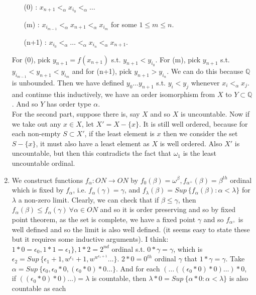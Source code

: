 \begin{enumerate}
    \begin{enumerate}
    \item[(0)]: $x_{n+1}<_\alpha x_{i_0} <_\alpha \ldots$\\
    \item[(m)]: $x_{i_{m-1}} <_\alpha x_{n+1} <_\alpha x_{i_m}$ for some $1 \le m \le n$.\\
    \item[(n+1)]: $x_{i_0} <_\alpha \ldots <_\alpha x_{i_n} <_\alpha x_{n+1}$.
    \end{enumerate}
    For (0), pick $y_{n+1}=f(x_{n+1})$ s.t. $y_{n+1} < y_{i_0}$. For (m), pick $y_{n+1}$ s.t. $y_{i_{m-1}} < y_{n+1} < y_{i_m}$ and for (n+1), pick $y_{n+1} > y_{i_n}$. We can do this because $\mathbb{Q}$ is unbounded. Then we have defined $y_0 \ldots y_{n+1}$ s.t. $y_i < y_j$ whenever $x_i <_\alpha x_j$. and continue this inductively, we have an order isomorphism from $X$ to $Y \subset \mathbb{Q}$. And so $Y$ has order type $\alpha$.\\
    For the second part, suppose there is, say $X$ and so $X$ is uncountable. Now if we take out any $x \in X$, let $X' = X-\{x\}$. It is still well ordered, because for each non-empty $S \subset X'$, if the least element is $x$ then we consider the set $S-\{x\}$, it must also have a least element as $X$ is well ordered. Also $X'$ is uncountable, but then this contradicts the fact that $\omega_1$ is the least uncountable ordinal.\\
\item We construct functions $f_\alpha: ON \rightarrow ON$ by $f_0(\beta)=\omega^\beta, f_{\alpha^+}(\beta)= \beta^{th}$ ordinal which is fixed by $f_\alpha$, i.e. $f_\alpha(\gamma)=\gamma$, and $f_\lambda(\beta) = Sup~\{f_\alpha(\beta): \alpha < \lambda\}$ for $\lambda$ a non-zero limit. Clearly, we can check that if $\beta \le \gamma$, then $f_\alpha(\beta) \le f_\alpha(\gamma)~\forall \alpha \in ON$ and so it is order preserving and so by fixed point theorem, as the set is complete, we have a fixed point $\gamma$ and so $f_{\alpha^+}$ is well defined and so the limit is also well defined. (it seems easy to state these but it requires some inductive arguments). I think:\\
    $1*0=\epsilon_0, 1*1=\epsilon_1\}, 1*2=2^{nd}$ ordinal s.t. $0*\gamma=\gamma$,
    which is $\epsilon_2=Sup~\{\epsilon_1 +1,w^{\epsilon_1}+1, w^{w^{\epsilon_1+1}} \ldots\}$.
    $2*0=0^{th}$ ordinal $\gamma$ that $1*\gamma=\gamma$.
    Take $\alpha=Sup~\{\epsilon_0,\epsilon_0 * 0, (\epsilon_0*0)*0 \ldots\}$.
    And for each $(\ldots ((\epsilon_0 * 0)*0) \ldots) *0$, if $((\epsilon_0 * 0)*0) \ldots)=\lambda$ is countable, then $\lambda *0=Sup~\{\alpha * 0: \alpha <\lambda\}$ is also countable as each

\end{enumerate}
